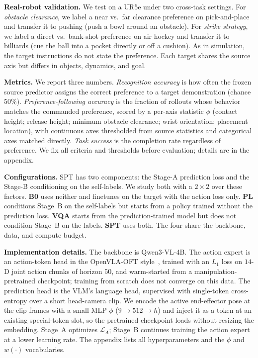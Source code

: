 \documentclass{article}
\begin{document}
\textbf{Real-robot validation.}
We test on a UR5e under two cross-task settings. For \emph{obstacle clearance},
we label a near vs.\ far clearance preference on pick-and-place and transfer it
to pushing (push a bowl around an obstacle). For \emph{strike strategy}, we label
a direct vs.\ bank-shot preference on air hockey and transfer it to billiards
(cue the ball into a pocket directly or off a cushion). As in simulation, the
target instructions do not state the preference. Each target shares the source
axis but differs in objects, dynamics, and goal.

\textbf{Metrics.}
We report three numbers. \emph{Recognition accuracy} is how often the frozen
source predictor assigns the correct preference to a target demonstration
(chance $50\%$). \emph{Preference-following accuracy} is the fraction of rollouts
whose behavior matches the commanded preference, scored by a per-axis statistic
$\phi$ (contact height; release height; minimum obstacle clearance; wrist
orientation; placement location), with continuous axes thresholded from source
statistics and categorical axes matched directly. \emph{Task success} is the
completion rate regardless of preference. We fix all criteria and thresholds
before evaluation; details are in the appendix.


\textbf{Configurations.}
SPT has two components: the Stage-A prediction loss and the Stage-B conditioning
on the self-labels. We study both with a $2\times2$ over these factors.
\textbf{B0} uses neither and finetunes on the target with the action loss only.
\textbf{PL} conditions Stage~B on the self-labels but starts from a policy
trained without the prediction loss. \textbf{VQA} starts from the
prediction-trained model but does not condition Stage~B on the labels.
\textbf{SPT} uses both. The four share the backbone, data, and compute budget.

\textbf{Implementation details.}
The backbone is Qwen3-VL-4B. The action expert is an action-token head in the
OpenVLA-OFT style~\citep{kim2025oft}, trained with an $L_1$ loss on $14$-D joint action chunks of
horizon $50$, and warm-started from a manipulation-pretrained checkpoint;
training from scratch does not converge on this data. The prediction head is the
VLM's language head, supervised with single-token cross-entropy over a short
head-camera clip. We encode the active end-effector pose at the clip frames with
a small MLP $\phi$ ($9\!\to\!512\!\to\!h$) and inject it as a token at an
existing special-token slot, so the pretrained checkpoint loads without resizing
the embedding. Stage~A optimizes $\mathcal{L}_A$; Stage~B continues training the
action expert at a lower learning rate. The appendix lists all hyperparameters
and the $\phi$ and $w(\cdot)$ vocabularies.
\end{document}

